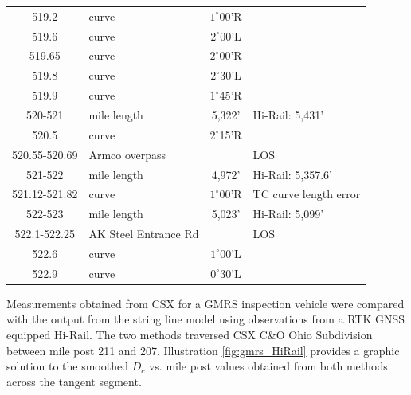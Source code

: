 \begin{center}
\begin{longtable}{c l c l}
	519.2&curve&$1^{\circ}$00'R&\\
	519.6&curve&$2^{\circ}$00'L&\\
	519.65&curve&$2^{\circ}$00'R&\\
	519.8&curve&$2^{\circ}$30'L&\\
	519.9&curve&$1^{\circ}$45'R&\\
520-521 & mile length & 5,322' &  Hi-Rail: 5,431' \\
	520.5&curve&$2^{\circ}$15'R&\\
	520.55-520.69&Armco overpass& &LOS\\
\hline
521-522 & mile length & 4,972' &  Hi-Rail: 5,357.6' \\
	521.12-521.82&curve&$1^{\circ}$00'R&TC curve length error\\
522-523 & mile length & 5,023' &  Hi-Rail: 5,099' \\
	522.1-522.25&AK Steel Entrance Rd&&LOS\\
	522.6&curve&$1^{\circ}$00'L&\\
	522.9&curve&$0^{\circ}$30'L&\\
\end{longtable}
\end{center}
\vspace{-30pt}

Measurements obtained from CSX for a GMRS inspection vehicle were compared with the output from the string line model using observations from a RTK GNSS equipped Hi-Rail. The two methods traversed CSX C\&O Ohio Subdivision between mile post 211 and 207. Illustration \ref{fig:gmrs_HiRail} provides a graphic solution to the smoothed $D_c$ vs. mile post values obtained from both methods across the tangent segment.

